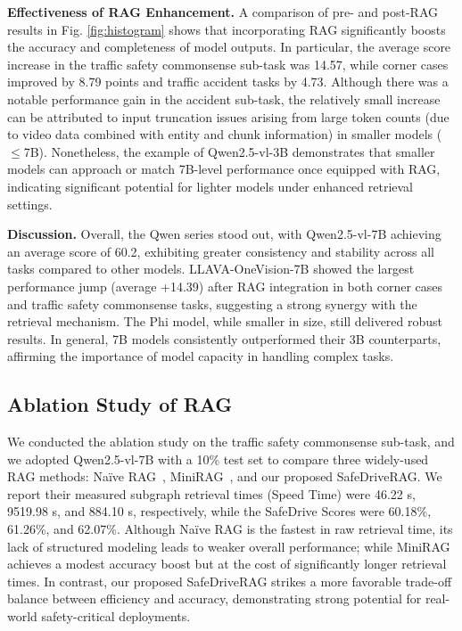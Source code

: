 \documentclass[sigconf]{acmart}
\begin{document}
\noindent\textbf{Effectiveness of RAG Enhancement.} A comparison of pre- and post-RAG results in Fig. \ref{fig:histogram} shows that incorporating RAG significantly boosts the accuracy and completeness of model outputs. In particular, the average score increase in the traffic safety commonsense sub-task was 14.57, while corner cases improved by 8.79 points and traffic accident tasks by 4.73. Although there was a notable performance gain in the accident sub-task, the relatively small increase can be attributed to input truncation issues arising from large token counts (due to video data combined with entity and chunk information) in smaller models ($\leq$7B). Nonetheless, the example of Qwen2.5-vl-3B demonstrates that smaller models can approach or match 7B-level performance once equipped with RAG, indicating significant potential for lighter models under enhanced retrieval settings. 

\noindent\textbf{Discussion.} Overall, the Qwen series stood out, with Qwen2.5-vl-7B achieving an average score of 60.2, exhibiting greater consistency and stability across all tasks compared to other models. LLAVA-OneVision-7B showed the largest performance jump (average +14.39) after RAG integration in both corner cases and traffic safety commonsense tasks, suggesting a strong synergy with the retrieval mechanism. The Phi model, while smaller in size, still delivered robust results. In general, 7B models consistently outperformed their 3B counterparts, affirming the importance of model capacity in handling complex tasks.

\subsection{Ablation Study of RAG}

We conducted the ablation study on the traffic safety commonsense sub-task, and we adopted Qwen2.5-vl-7B with a 10\% test set to compare three widely-used RAG methods: Naïve RAG~\cite{mao2020generation}, MiniRAG~\cite{fan2025minirag}, and our proposed SafeDriveRAG. We report their measured subgraph retrieval times (Speed Time) were 46.22 s, 9519.98 s, and 884.10 s, respectively, while the SafeDrive Scores were 60.18\%, 61.26\%, and 62.07\%. Although Naïve RAG is the fastest in raw retrieval time, its lack of structured modeling leads to weaker overall performance; while MiniRAG achieves a modest accuracy boost but at the cost of significantly longer retrieval times. In contrast, our proposed SafeDriveRAG strikes a more favorable trade-off balance between efficiency and accuracy, demonstrating strong potential for real-world safety-critical deployments.
\end{document}
